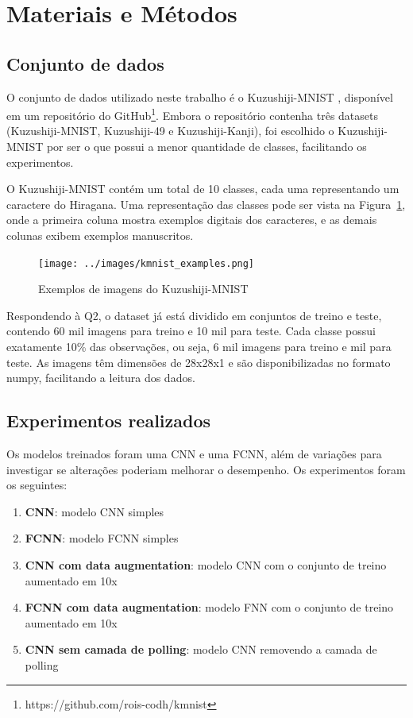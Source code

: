 \documentclass[12pt]{article}
\begin{document}
\section{Materiais e Métodos} 

\subsection{Conjunto de dados}

O conjunto de dados utilizado neste trabalho é o Kuzushiji-MNIST \cite{DBLP:journals/corr/abs-1812-01718}, disponível em um repositório do GitHub\footnote{https://github.com/rois-codh/kmnist}. Embora o repositório contenha três datasets (Kuzushiji-MNIST, Kuzushiji-49 e Kuzushiji-Kanji), foi escolhido o Kuzushiji-MNIST por ser o que possui a menor quantidade de classes, facilitando os experimentos.

O Kuzushiji-MNIST contém um total de 10 classes, cada uma representando um caractere do Hiragana. Uma representação das classes pode ser vista na Figura~\ref{fig:kmnist-examples}, onde a primeira coluna mostra exemplos digitais dos caracteres, e as demais colunas exibem exemplos manuscritos.

\begin{figure}[ht]
  \centering
  \texttt{[image: ../images/kmnist\_examples.png]}
  \caption{Exemplos de imagens do Kuzushiji-MNIST}
  \label{fig:kmnist-examples}
\end{figure}

Respondendo à Q2, o dataset já está dividido em conjuntos de treino e teste, contendo 60 mil imagens para treino e 10 mil para teste. Cada classe possui exatamente 10\% das observações, ou seja, 6 mil imagens para treino e mil para teste. As imagens têm dimensões de 28x28x1 e são disponibilizadas no formato numpy, facilitando a leitura dos dados.

\subsection{Experimentos realizados}

Os modelos treinados foram uma CNN e uma FCNN, além de variações para investigar se alterações poderiam melhorar o desempenho. Os experimentos foram os seguintes:

\begin{enumerate}
  \item \textbf{CNN}: modelo CNN simples
  \item \textbf{FCNN}: modelo FCNN simples 
  \item \textbf{CNN com data augmentation}: modelo CNN com o conjunto de treino aumentado em 10x
  \item \textbf{FCNN com data augmentation}: modelo FNN com o conjunto de treino aumentado em 10x
  \item \textbf{CNN sem camada de polling}: modelo CNN removendo a camada de polling
\end{enumerate}
\end{document}
